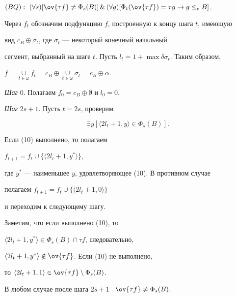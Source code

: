 $(BQ):\ (\forall s)[\ov{\tau f}\neq\Phi_s(B)]\,\&\,


(\forall g)[\Phi_t(\ov{\tau f})=\tau g\to g\leq_eB]$.





Через $f_t$ обозначим подфункцию $f$, построенную к концу шага $t$, имеющую


вид $c_B\oplus\sigma_t$, где $\sigma_t$ --- некоторый конечный начальный


сегмент, выбранный на шаге $t$. Пусть $l_t=1+\max\delta\sigma_t$. Таким образом,


$f=\mathop{\cup}\limits_{t\in\omega}f_t=c_B\oplus


\mathop{\cup}\limits_{t\in\omega}\sigma_t=c_B\oplus\alpha$.


\smallskip





{\it Шаг} 0. Полагаем $f_0=c_B\oplus\emptyset$ и $l_0=0$.


\smallskip





{\it Шаг} $2s+1$. Пусть $t=2s$, проверим


\begin{equation} \label{t51}


\exists y[\langle 2l_t+1,y\rangle\in\Phi_s(B)].


\end{equation}


Если (10) выполнено, то полагаем


$f_{t+1}=f_t\cup\{\langle 2l_t+1,y^*\rangle\}$,


где $y^*$ --- наименьшее $y$, удовлетворяющее (10). В противном случае


полагаем $f_{t+1}=f_t\cup\{\langle 2l_t+1,0\rangle\}$


и переходим к следующему шагу.





Заметим, что если выполнено (10), то


$\langle 2l_t+1,y^*\rangle\in\Phi_s(B)\cap\tau f$, следовательно,


$\langle 2l_t+1,y^*\rangle\notin\ov{\tau f}$. Если (10) не выполнено,


то $\langle 2l_t+1,1\rangle\in\ov{\tau f}\setminus\Phi_s(B)$.


В любом случае после шага $2s+1$ \ $\ov{\tau f}\neq\Phi_s(B)$.


